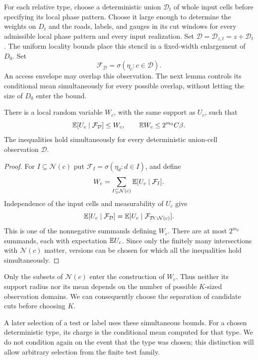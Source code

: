For each relative type, choose a deterministic union $\mathcal D_t$ of
whole input cells before specifying its local phase pattern. Choose it
large enough to determine the weights on $D_t$ and the roads, labels,
and gauges in its cut windows for every admissible local phase pattern
and every input realization. Set $\mathcal D=\mathcal D_{z,t}=z+\mathcal D_t$.
The uniform locality bounds place this stencil in a fixed-width
enlargement of $D_0$. Set
\[
             \mathcal F_{\mathcal D}
                   =\sigma(\eta_c:c\in\mathcal D).
\]
An access envelope may overlap this observation.  The next lemma controls
its conditional mean simultaneously for every possible overlap, without
letting the size of $D_0$ enter the bound.

\begin{lemma}\label{access:conditioning}
There is a local random variable $W_c$, with the same support as $U_c$,
such that
\begin{equation}\label{access:all-conditionals}
 \mathbb E[U_c\mid\mathcal F_{\mathcal D}]\le W_c,
 \qquad \mathbb E W_c\le 2^{m_0}C\beta.
\end{equation}
The inequalities hold simultaneously for every deterministic union-cell
observation $\mathcal D$.
\end{lemma}

\begin{proof}
For $I\subseteq\mathcal N(c)$ put
$\mathcal F_I=\sigma(\eta_d:d\in I)$, and define
\[
           W_c=\sum_{I\subseteq\mathcal N(c)}
                        \mathbb E[U_c\mid\mathcal F_I].
\]
Independence of the input cells and measurability of $U_c$ give
\[
 \mathbb E[U_c\mid\mathcal F_{\mathcal D}]
 =\mathbb E[U_c\mid\mathcal F_{\mathcal D\cap\mathcal N(c)}].
\]
This is one of the nonnegative summands defining $W_c$.  There are at most
$2^{m_0}$ summands, each with expectation $\mathbb E U_c$.  Since only the
finitely many intersections with $\mathcal N(c)$ matter, versions can be
chosen for which all the inequalities hold simultaneously.
\end{proof}

Only the subsets of $\mathcal N(c)$ enter the construction of $W_c$.
Thus neither its support radius nor its mean depends on the number of
possible $K$-sized observation domains.  We can consequently choose the
separation of candidate cuts before choosing $K$.

A later selection of a test or label uses these simultaneous bounds.
For a chosen deterministic type, its charge is the conditional mean
computed for that type.  We do not condition again on the event that the
type was chosen; this distinction will allow arbitrary selection from
the finite test family.

